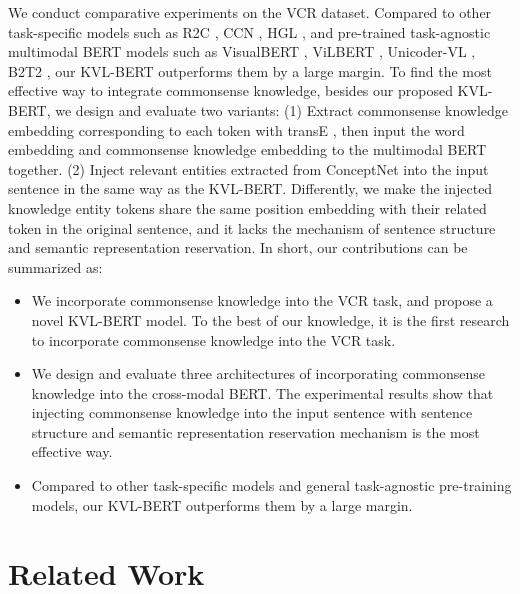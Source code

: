 \documentclass[conference]{IEEEtran}
\begin{document}
We conduct comparative experiments on the VCR dataset. Compared to other task-specific models such as R2C \cite{b10}, CCN \cite{b17}, HGL \cite{b18}, and pre-trained task-agnostic multimodal BERT models such as VisualBERT \cite{b12}, ViLBERT \cite{b13}, Unicoder-VL \cite{b19}, B2T2 \cite{b15}, our KVL-BERT outperforms them by a large margin. To find the most effective way to integrate commonsense knowledge, besides our proposed KVL-BERT, we design and evaluate two variants: (1) Extract commonsense knowledge embedding corresponding to each token with transE \cite{bb16}, then input the word embedding and commonsense knowledge embedding to the multimodal BERT together. (2) Inject relevant entities extracted from ConceptNet into the input sentence in the same way as the KVL-BERT. Differently, we make the injected knowledge entity tokens share the same position embedding with their related token in the original sentence, and it lacks the mechanism of sentence structure and semantic representation reservation. In short, our contributions can be summarized as:
\begin{itemize}
\item We incorporate commonsense knowledge into the VCR task, and propose a novel KVL-BERT model. To the best of our knowledge, it is the first research to incorporate commonsense knowledge into the VCR task.
\item We design and evaluate three architectures of incorporating commonsense knowledge into the cross-modal BERT. The experimental results show that injecting commonsense knowledge into the input sentence with sentence structure and semantic representation reservation mechanism is the most effective way.

\item Compared to other task-specific models and general task-agnostic pre-training models, our KVL-BERT outperforms them by a large margin.

\end{itemize}

\section{Related Work}
\end{document}
